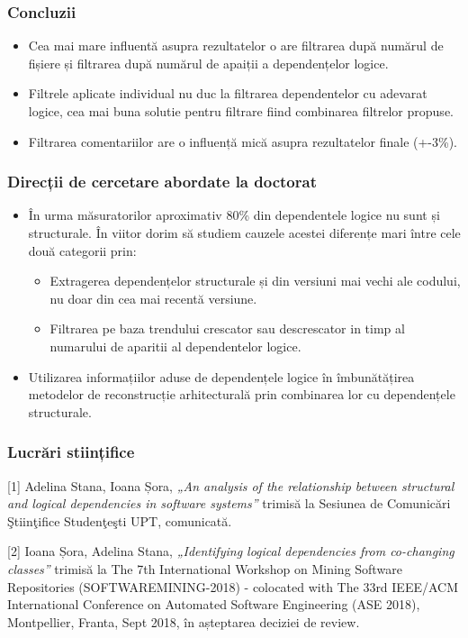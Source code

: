 \documentclass{beamer}
\begin{document}
 \begin{frame}
\frametitle{Concluzii}

\begin{itemize}
\item Cea mai mare influentă asupra rezultatelor o are filtrarea după numărul de fișiere și filtrarea după numărul de apaiții a dependențelor logice.
\item Filtrele aplicate individual nu duc la filtrarea dependentelor cu adevarat logice, cea mai buna solutie pentru filtrare fiind combinarea filtrelor propuse.
\item Filtrarea comentariilor are o influență mică asupra rezultatelor finale (+-3\%).
\end{itemize}

\end{frame}


 \begin{frame}
\frametitle{Direcții de cercetare abordate la doctorat}


\begin{itemize}
\item În urma măsuratorilor aproximativ 80\% din dependentele logice nu sunt și structurale. În viitor dorim să studiem cauzele acestei diferențe mari între cele două categorii prin:
\begin{itemize}
\item Extragerea dependențelor structurale și din versiuni mai vechi ale codului, nu doar din cea mai recentă versiune.
\item Filtrarea pe baza trendului crescator sau descrescator in timp al numarului de aparitii al dependentelor logice.
\end{itemize}
 \item Utilizarea informațiilor aduse de dependențele logice în îmbunătățirea metodelor de reconstrucție arhitecturală prin combinarea lor cu dependențele structurale.
\end{itemize}
\end{frame}



 \begin{frame}
\frametitle{Lucrări stiințifice}
[1] Adelina Stana, Ioana Șora, \textit{„An analysis of the relationship between structural and logical dependencies in software systems”} trimisă la Sesiunea de Comunicări Ştiinţifice Studenţeşti UPT, comunicată.

[2] Ioana Șora, Adelina Stana, \textit{„Identifying logical dependencies from co-changing classes”}  trimisă la The 7th International Workshop on Mining Software Repositories (SOFTWAREMINING-2018) - colocated with The 33rd IEEE/ACM International  Conference on Automated Software Engineering (ASE 2018), Montpellier, Franta, Sept 2018, în așteptarea deciziei de review.


\end{frame}
\end{document}
